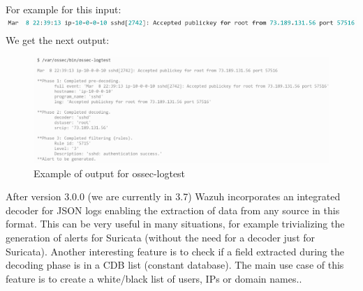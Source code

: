 \linej
\linej
For example for this input:
\linej
\includegraphics[width=\textwidth]{figuras/ossec-logtest_input.png}
\linej
We get the next output:
\begin{figure}[H]
  \centering
	\includegraphics[width=\textwidth]{figuras/ossec-logtest_output.png}
	\caption{Example of output for ossec-logtest}
\end{figure}
\linej
After version 3.0.0 (we are currently in 3.7) Wazuh incorporates an integrated decoder for JSON logs enabling the extraction of data from any source in this format. This can be very useful in many situations, for example trivializing the generation of alerts for Suricata (without the need for a decoder just for Suricata)\cite{wazuh_json}.
\linej
\linej
Another interesting feature is to check if a field extracted during the decoding phase is in a CDB list (constant database). The main use case of this feature is to create a white/black list of users, IPs or domain names.\cite{wazuh_cdb}.
